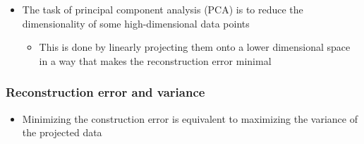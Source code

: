 \documentclass[11pt]{article}
\begin{document}
\begin{itemize}
\item The task of principal component analysis (PCA) is to reduce the dimensionality of some high-dimensional data points
\begin{itemize}
\item This is done by linearly projecting them onto a lower dimensional space in a way that makes the reconstruction error minimal
\end{itemize}
\end{itemize}

\subsubsection{Reconstruction error and variance}
\label{sec:org5d356c0}
\begin{itemize}
\item Minimizing the construction error is equivalent to maximizing the variance of the projected data
\end{itemize}
\end{document}

